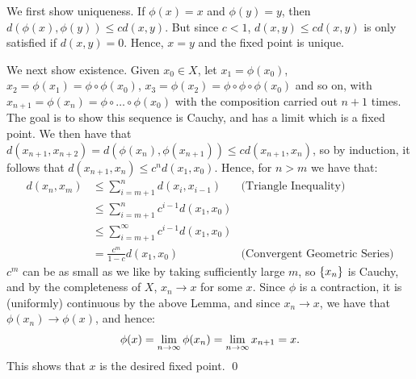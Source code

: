 \begin{nproof}
    We first show uniqueness. If $\phi(x) = x$ and $\phi(y) = y$, then $d(\phi(x), \phi(y)) \leq cd(x, y)$. But since $c < 1$, $d(x, y) \leq cd(x, y)$ is only satisfied if $d(x, y) = 0$. Hence, $x = y$ and the fixed point is unique.

    We next show existence. Given $x_0 \in X$, let $x_1 = \phi(x_0)$, $x_2 = \phi(x_1) = \phi\circ \phi(x_0)$, $x_3 = \phi(x_2) = \phi\circ\phi\circ\phi(x_0)$ and so on, with $x_{n+1} = \phi(x_n) = \phi \circ \ldots \circ \phi(x_0)$ with the composition carried out $n+1$ times. The goal is to show this sequence is Cauchy, and has a limit which is a fixed point. We then have that $d(x_{n+1}, x_{n+2}) = d(\phi(x_n), \phi(x_{n+1})) \leq cd(x_{n+1}, x_n)$, so by induction, it follows that $d(x_{n+1}, x_n) \leq c^nd(x_1, x_0)$. Hence, for $n > m$ we have that:
    \begin{align*}
        d(x_n, x_m) &\leq \sum_{i=m+1}^n d(x_i, x_{i-1}) & \text{(Triangle Inequality)}
        \\ &\leq \sum_{i=m+1}^n c^{i-1}d(x_1, x_0)
        \\ &\leq \sum_{i=m+1}^\infty c^{i-1}d(x_1, x_0)
        \\ &= \frac{c^m}{1-c}d(x_1, x_0) & \text{(Convergent Geometric Series)}
    \end{align*}
    $c^m$ can be as small as we like by taking sufficiently large $m$, so $\set{x_n}$ is Cauchy, and by the completeness of $X$, $x_n \rightarrow x$ for some $x$. Since $\phi$ is a contraction, it is (uniformly) continuous by the above Lemma, and since $x_n \rightarrow x$, we have that $\phi(x_n) \rightarrow \phi(x)$, and hence:
    \begin{align*}
        \phi(x) = \lim_{n \rightarrow \infty} \phi(x_n) = \lim_{n \rightarrow \infty} x_{n+1} = x.
    \end{align*}
    This shows that $x$ is the desired fixed point. \qed
\end{nproof}

